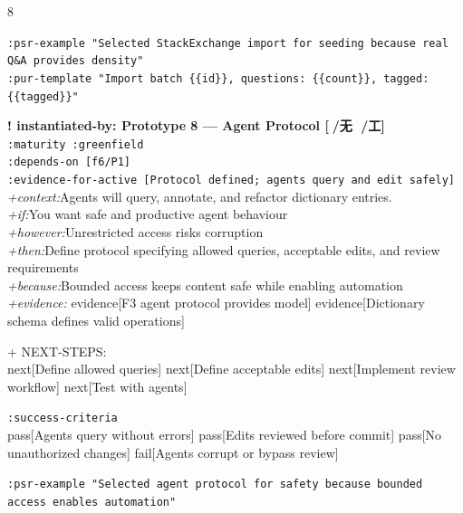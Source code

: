 \documentclass[landscape]{article}
\newcommand{\flexitag}[1]{\textcolor[gray]{0.35}{\textit{#1}}}
\newenvironment{devmapactive}{%
  \def\FrameCommand{\colorbox{devmapactivebg}}%
  \setlength{\fboxsep}{2pt}%
  \MakeFramed{\advance\hsize-\width \FrameRestore}%
}{\endMakeFramed}
\newenvironment{devmapgreenfield}{%
  \def\FrameCommand{\colorbox{devmapgreenfieldbg}}%
  \setlength{\fboxsep}{2pt}%
  \MakeFramed{\advance\hsize-\width \FrameRestore}%
}{\endMakeFramed}
\begin{document}
\begin{paracol}{8}
\begin{devmapactive}
  \texttt{:\allowbreak{}psr-\allowbreak{}example "Selected StackExchange import for seeding because real Q\&\allowbreak{}A provides density"}\\
  \texttt{:\allowbreak{}pur-\allowbreak{}template "Import batch \{\{id\}\},\allowbreak{} questions:\allowbreak{} \{\{count\}\},\allowbreak{} tagged:\allowbreak{} \{\{tagged\}\}"}\\
\par
\par
\end{devmapactive}
\begin{devmapgreenfield}
\textbf{! instantiated-by: Prototype 8 — Agent Protocol [🙅/无 🍍/工]}\\
  \texttt{:\allowbreak{}maturity :\allowbreak{}greenfield}\\
  \texttt{:\allowbreak{}depends-\allowbreak{}on [f6/\allowbreak{}P1]}\\
  \texttt{:\allowbreak{}evidence-\allowbreak{}for-\allowbreak{}active [Protocol defined;\allowbreak{} agents query and edit safely]}\\
  \flexitag{+context:}Agents will query, annotate, and refactor dictionary entries.\\
  \flexitag{+if:}You want safe and productive agent behaviour\\
  \flexitag{+however:}Unrestricted access risks corruption\\
  \flexitag{+then:}Define protocol specifying allowed queries, acceptable edits, and review requirements\\
  \flexitag{+because:}Bounded access keeps content safe while enabling automation\\
  \flexitag{+evidence:} evidence[F3 agent protocol provides model] evidence[Dictionary schema defines valid operations]\\
\par
  + NEXT-STEPS:\\
    next[Define allowed queries] next[Define acceptable edits] next[Implement review workflow] next[Test with agents]\\
\par
  \texttt{:\allowbreak{}success-\allowbreak{}criteria}\\
    pass[Agents query without errors] pass[Edits reviewed before commit] pass[No unauthorized changes] fail[Agents corrupt or bypass review]\\
\par
  \texttt{:\allowbreak{}psr-\allowbreak{}example "Selected agent protocol for safety because bounded access enables automation"}\\

\end{devmapgreenfield}
\end{paracol}
\end{document}
